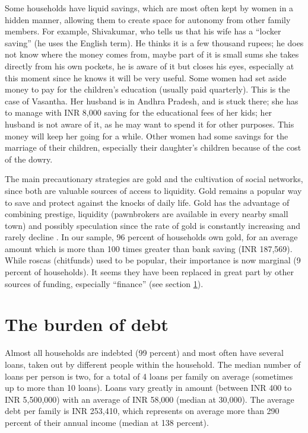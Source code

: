 \documentclass[a4paper, 11pt, onecolumn]{article}
\begin{document}
Some households have liquid savings, which are most often kept by women in a hidden manner, allowing them to create space for autonomy from other family members. For example, Shivakumar, who tells us that his wife has a ``locker saving'' (he uses the English term). He thinks it is a few thousand rupees; he does not know where the money comes from, maybe part of it is small sums she takes directly from his own pockets, he is aware of it but closes his eyes, especially at this moment since he knows it will be very useful. Some women had set aside money to pay for the children's education (usually paid quarterly). This is the case of Vasantha. Her husband is in Andhra Pradesh, and is stuck there; she has to manage with INR 8,000 saving for the educational fees of her kids; her husband is not aware of it, as he may want to spend it for other purposes. This money will keep her going for a while. Other women had some savings for the marriage of their children, especially their daughter's children because of the cost of the dowry. 

The main precautionary strategies are gold and the cultivation of social networks, since both are valuable sources of access to liquidity. Gold remains a popular way to save and protect against the knocks of daily life. Gold has the advantage of combining prestige, liquidity (pawnbrokers are available in every nearby small town) and possibly speculation since the rate of gold is constantly increasing and rarely decline \citep{Goedecke2017}. In our sample, 96 percent of households own gold, for an average amount which is more than 100 times greater than bank saving (INR 187,569). While roscas (chitfunds) used to be popular, their importance is now marginal (9 percent of households). It seems they have been replaced in great part by other sources of funding, especially “finance” (see section \ref{section:burden}). 

\section{The burden of debt}
\label{section:burden}

Almost all households are indebted (99 percent) and most often have several loans, taken out by different people within the household. The median number of loans per person is two, for a total of 4 loans per family on average (sometimes up to more than 10 loans). Loans vary greatly in amount (between INR 400 to INR 5,500,000) with an average of INR 58,000 (median at 30,000). The average debt per family is INR 253,410, which represents on average more than 290 percent of their annual income (median at 138 percent).
\end{document}
